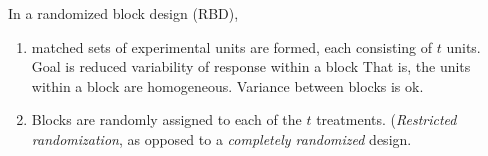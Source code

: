 In a randomized block design (RBD), %
\begin{enumerate}
\item matched sets of experimental units are formed, each consisting
of $t$ units.  Goal is reduced variability of response within a block
That is, the units within a block are homogeneous.  Variance between 
blocks is ok.
\item Blocks are randomly assigned to each of the
$t$ treatments.  ({\em Restricted randomization}, as opposed to 
a {\em completely randomized} design.
\end{enumerate}
\bigkn
